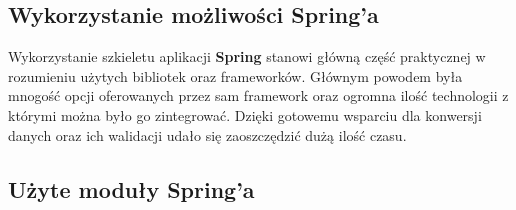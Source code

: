	\subsection{Wykorzystanie możliwości Spring'a}
		Wykorzystanie szkieletu aplikacji \textbf{Spring} stanowi główną część praktycznej w rozumieniu użytych bibliotek oraz 
		frameworków. Głównym powodem była mnogość opcji oferowanych przez sam framework oraz ogromna ilość technologii z którymi
		można było go zintegrować. Dzięki gotowemu wsparciu dla konwersji danych oraz ich walidacji udało się zaoszczędzić
		dużą ilość czasu.
		
	\subsection{Użyte moduły Spring'a}
	
